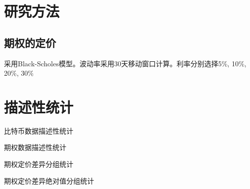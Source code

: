 \documentclass[bachelor]{thuthesis}
\begin{document}
\section{研究方法}
    \subsection{期权的定价}
    采用Black-Scholes模型。波动率采用30天移动窗口计算。利率分别选择5\%, 10\%, 20\%, 30\%

\section{描述性统计}

\begin{table}
    \caption{比特币数据描述性统计}
    
    
\end{table}
\begin{table}
    \caption{期权数据描述性统计}

\end{table}
\begin{table}
    \caption{期权定价差异分组统计}
    
\end{table}
\begin{table}
    \caption{期权定价差异绝对值分组统计}
    
\end{table}
\end{document}
